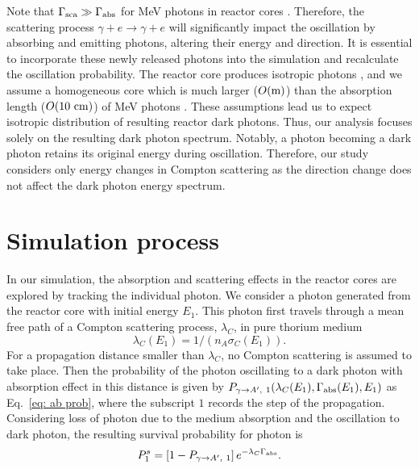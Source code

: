 \documentclass[prd,showpacs,preprintnumbers,amsmath,amssymb,twocolumn,superscriptaddress,notitlepage]{revtex4-2}
\begin{document}
Note that $\Gamma_{\rm sca} \gg \Gamma_{\rm abs}$ for MeV photons in reactor cores \cite{ParticleDataGroup:2022pth, Berger:xcom}. Therefore, the scattering process $\gamma + e \to \gamma + e$ will significantly impact the oscillation by absorbing and emitting photons, altering their energy and direction. It is essential to incorporate these newly released photons into the simulation and recalculate the oscillation probability.
The reactor core produces isotropic photons \cite{Bechteler:1984}, and we assume a homogeneous core \cite{Dent:2019ueq} which is much larger ($O(\rm{m})$) than the absorption length ($O(10~\rm{cm})$) of MeV photons \cite{Danilov:2018bks}.
These assumptions lead us to expect isotropic distribution of resulting reactor dark photons. Thus, our analysis focuses solely on the resulting dark photon spectrum. Notably, a photon becoming a dark photon retains its original energy during oscillation. Therefore, our study considers only energy changes in Compton scattering as the direction change does not affect the dark photon energy spectrum.
\\


\section{Simulation process}

In our simulation, the absorption and scattering effects in the reactor cores are explored by tracking the individual photon. 
We consider a photon generated from the reactor core with initial energy $E_1$. 
This photon first travels through a mean free path of a Compton scattering process, $\lambda_C $, in pure thorium medium
\cite{Berger:xcom}
\begin{equation}
\lambda_C (E_1) = 1 / (n_A \sigma_C ( E_1)).
\end{equation}
For a propagation distance smaller than $\lambda_C $, no Compton scattering is assumed to take place.
Then the probability of the photon oscillating to a dark photon with absorption effect in this distance is given by $P_{\gamma \to A',\ 1}(\lambda_C (E_1), \Gamma_{\rm abs} (E_1), E_1)$ as Eq.~\eqref{eq: ab prob}, where the subscript $1$ records the step of the propagation. 
Considering loss of photon due to the medium absorption and the oscillation to dark photon, the resulting survival probability for photon is 
\begin{eqnarray}
P^s_1 =
\left[1 - P_{\gamma \to A',\ 1} \right] e^{-\lambda_C \Gamma_{\rm abs} }.
\end{eqnarray}
\end{document}
